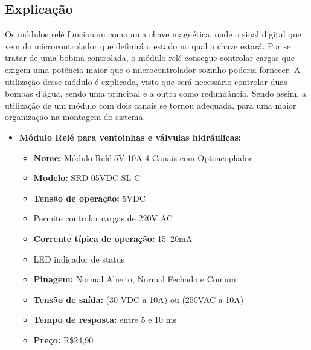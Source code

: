 \begin{itemize}
\subsection{Explicação}
Os módulos relé funcionam como uma chave magnética, onde o sinal digital que vem do microcontrolador que definirá o estado no qual a chave estará. Por se tratar de uma bobina controlada, o módulo relé consegue controlar cargas que exigem uma potência maior que o microcontrolador sozinho poderia fornecer. A utilização desse módulo é explicada, visto que será necessário controlar duas bombas d'água, sendo uma principal e a outra como redundância. Sendo assim, a utilização de um módulo com dois canais se tornou adequada, para uma maior organização na montagem do sistema.\\
\begin{itemize}
	\item \textbf{Módulo Relé para ventoinhas e válvulas hidráulicas:}
	\begin{itemize}
		\item \textbf{Nome:} Módulo Relé 5V 10A 4 Canais com Optoacoplador
		\item \textbf{Modelo:} SRD-05VDC-SL-C 
		\item \textbf{Tensão de operação:} 5VDC
		\item Permite controlar cargas de 220V AC
		\item \textbf{Corrente típica de operação:} 15~20mA
		\item LED indicador de status
		\item \textbf{Pinagem:} Normal Aberto, Normal Fechado e Comum
		\item \textbf{Tensão de saída:} (30 VDC a 10A) ou (250VAC a 10A)
		\item \textbf{Tempo de resposta:} entre 5 e 10 ms
		\item \textbf{Preço:} R\$24,90
	\end{itemize}
	
	
\end{itemize}


\end{itemize}
